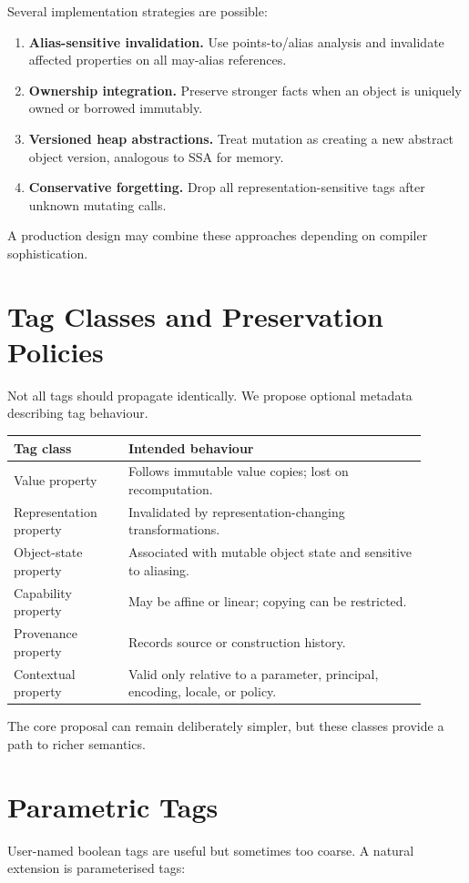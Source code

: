 \documentclass[11pt]{article}
\begin{document}
Several implementation strategies are possible:
\begin{enumerate}
  \item \textbf{Alias-sensitive invalidation.} Use points-to/alias analysis and invalidate affected properties on all may-alias references.
  \item \textbf{Ownership integration.} Preserve stronger facts when an object is uniquely owned or borrowed immutably.
  \item \textbf{Versioned heap abstractions.} Treat mutation as creating a new abstract object version, analogous to SSA for memory.
  \item \textbf{Conservative forgetting.} Drop all representation-sensitive tags after unknown mutating calls.
\end{enumerate}

A production design may combine these approaches depending on compiler sophistication.

\section{Tag Classes and Preservation Policies}
Not all tags should propagate identically. We propose optional metadata describing tag behaviour.

\begin{longtable}{>{\raggedright\arraybackslash}p{0.25\linewidth} p{0.65\linewidth}}
\toprule
Tag class & Intended behaviour \\
\midrule
Value property & Follows immutable value copies; lost on recomputation. \\
Representation property & Invalidated by representation-changing transformations. \\
Object-state property & Associated with mutable object state and sensitive to aliasing. \\
Capability property & May be affine or linear; copying can be restricted. \\
Provenance property & Records source or construction history. \\
Contextual property & Valid only relative to a parameter, principal, encoding, locale, or policy. \\
\bottomrule
\end{longtable}

The core proposal can remain deliberately simpler, but these classes provide a path to richer semantics.

\section{Parametric Tags}
User-named boolean tags are useful but sometimes too coarse. A natural extension is parameterised tags:
\end{document}
